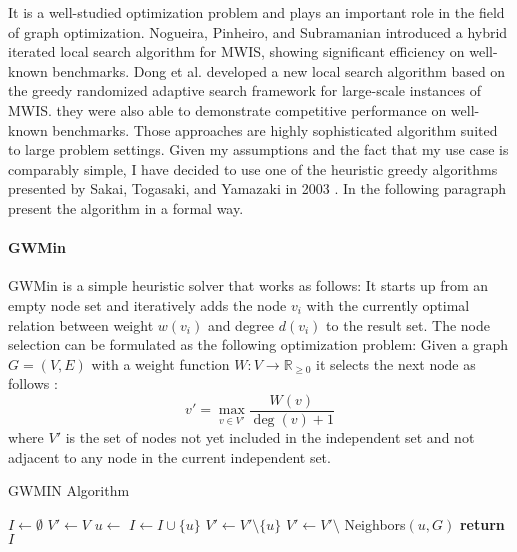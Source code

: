It is a well-studied optimization problem and plays an important role in the field of graph optimization.
Nogueira, Pinheiro, and Subramanian \cite{Nogueira2018A} introduced a hybrid iterated local search algorithm for MWIS, showing significant efficiency on well-known benchmarks.
Dong et al. \cite{Dong2022A} developed a new local search algorithm based on the greedy randomized adaptive search framework for large-scale instances of MWIS.
they were also able to demonstrate competitive performance on well-known benchmarks.
Those approaches are highly sophisticated algorithm suited to large problem settings.
Given my assumptions and the fact that my use case is comparably simple, I have decided to use one of the heuristic greedy algorithms presented by Sakai, Togasaki, and Yamazaki in 2003 \cite{SAKAI2003313}.
In the following paragraph present the algorithm in a formal way.

\paragraph{GWMin}
GWMin is a simple heuristic solver that works as follows:
It starts up from an empty node set
and iteratively adds the node $v_i$ with the currently optimal relation between weight $w(v_i)$ and degree $d(v_i)$ to the result set.
The node selection can be formulated as the following optimization problem:
Given a graph $G = (V, E)$ with a weight function $W: V \to \mathbb{R}_{\geq 0}$ it selects the next node as follows :
\[
    v' = \max_{v \in V'} \frac{W(v)}{\deg(v) + 1}
\]
where $V'$ is the set of nodes not yet included in the independent set and not adjacent to any node in the current independent set.


\begin{algorithm}
    \caption{GWMIN Algorithm}
    \begin{algorithmic}[1]
            \State $I \gets \emptyset$ 
            \State $V' \gets V$ 
                \State $u \gets$ 
                \State $I \gets I \cup \{u\}$ 
                \State $V' \gets V' \setminus \{u\}$ 
                \State $V' \gets V' \setminus$ Neighbors$(u, G)$ 
            \EndWhile
            \State \textbf{return} $I$
        \EndProcedure
    \end{algorithmic}\label{alg:algorithm-gwmin}
\end{algorithm}

